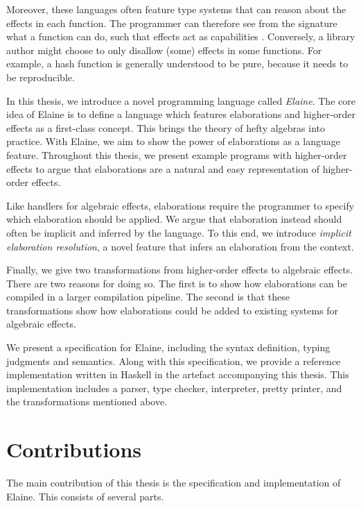 Moreover, these languages often feature type systems that can reason about the effects in each function. The programmer can therefore see from the signature what a function can do, such that effects act as capabilities \autocite{brachthauser_effects_2020}. Conversely, a library author might choose to only disallow (some) effects in some functions. For example, a hash function is generally understood to be pure, because it needs to be reproducible.

In this thesis, we introduce a novel programming language called \emph{Elaine}. The core idea of Elaine is to define a language which features elaborations and higher-order effects as a first-class concept. This brings the theory of hefty algebras into practice. With Elaine, we aim to show the power of elaborations as a language feature. Throughout this thesis, we present example programs with higher-order effects to argue that elaborations are a natural and easy representation of higher-order effects.

Like handlers for algebraic effects, elaborations require the programmer to specify which elaboration should be applied. We argue that elaboration instead should often be implicit and inferred by the language. To this end, we introduce \emph{implicit elaboration resolution}, a novel feature that infers an elaboration from the context.

Finally, we give two transformations from higher-order effects to algebraic effects. There are two reasons for doing so. The first is to show how elaborations can be compiled in a larger compilation pipeline. The second is that these transformations show how elaborations could be added to existing systems for algebraic effects.

We present a specification for Elaine, including the syntax definition, typing judgments and semantics. Along with this specification, we provide a reference implementation written in Haskell in the artefact accompanying this thesis. This implementation includes a parser, type checker, interpreter, pretty printer, and the transformations mentioned above.

\section{Contributions}

The main contribution of this thesis is the specification and implementation of Elaine. This consists of several parts.

